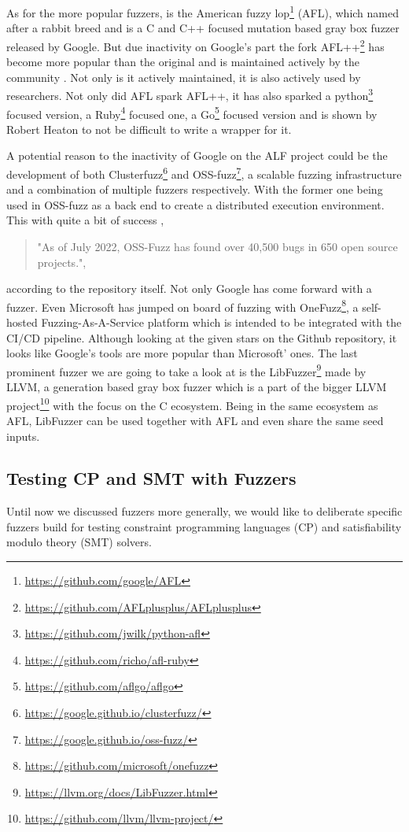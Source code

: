 As for the more popular fuzzers, is the American fuzzy lop\footnote{\url{https://github.com/google/AFL}} (AFL), which named after a rabbit breed and is a C and C++ focused mutation based gray box fuzzer released by Google. But due inactivity on Google's part the fork AFL++\footnote{\url{https://github.com/AFLplusplus/AFLplusplus}} has become more popular than the original and is maintained actively by the community \cite{27AFL++}. Not only is it actively maintained, it is also actively used by researchers. Not only did AFL spark AFL++, it has also sparked a python\footnote{\url{https://github.com/jwilk/python-afl}} focused version, a Ruby\footnote{\url{https://github.com/richo/afl-ruby}} focused one, a Go\footnote{\url{https://github.com/aflgo/aflgo}} focused version and is shown by Robert Heaton \cite{AFLWrapper} to not be difficult to write a wrapper for it. 

A potential reason to the inactivity of Google on the ALF project could be the development of both Clusterfuzz\footnote{\url{https://google.github.io/clusterfuzz/}} and OSS-fuzz\footnote{\url{https://google.github.io/oss-fuzz/}}, a scalable fuzzing infrastructure and a combination of multiple fuzzers respectively. With the former one being used in OSS-fuzz as a back end to create a distributed execution environment. This with quite a bit of success \cite{31OSS-FuzzBugs},
\begin{quote} 
	"As of July 2022, OSS-Fuzz has found over 40,500 bugs in 650 open source projects.",
\end{quote} according to the repository itself. 
Not only Google has come forward with a fuzzer. Even Microsoft has jumped on board of fuzzing with OneFuzz\footnote{\url{https://github.com/microsoft/onefuzz}}, a self-hosted Fuzzing-As-A-Service platform which is intended to be integrated with the CI/CD pipeline. Although looking at the given stars on the Github repository, it looks like Google's tools are more popular than Microsoft' ones.
The last prominent fuzzer we are going to take a look at is the LibFuzzer\footnote{\url{https://llvm.org/docs/LibFuzzer.html}} made by LLVM, a generation based gray box fuzzer which is a part of the bigger LLVM project\footnote{\url{https://github.com/llvm/llvm-project/}} with the focus on the C ecosystem. Being in the same ecosystem as AFL, LibFuzzer can be used together with AFL and even share the same seed inputs.

\subsection{Testing CP and SMT with Fuzzers}
Until now we discussed fuzzers more generally, we would like to deliberate specific fuzzers build for testing constraint programming languages (CP) and satisfiability modulo theory (SMT) solvers.


